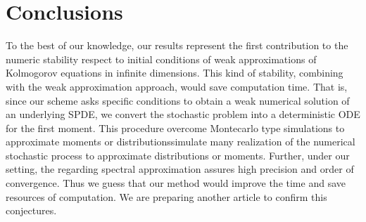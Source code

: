 \documentclass[]{interact}
\theoremstyle{plain}%
\theoremstyle{definition}
\theoremstyle{remark}
\begin{document}
\section{Conclusions}
        To the best of our knowledge, our results represent the first 
    contribution to the numeric stability respect to initial conditions of weak 
    approximations of Kolmogorov equations in infinite dimensions. This kind of 
    stability, combining with the weak approximation approach, 
    would save computation time. That is, since our scheme asks specific 
    conditions to obtain a weak numerical solution of an underlying SPDE, we 
    convert the stochastic problem into a deterministic ODE for the first 
    moment. This procedure overcome Montecarlo type simulations to  approximate 
    moments or distributions\textemdash simulate many realization of the 
    numerical stochastic process to approximate distributions or moments. 
    Further, under  our setting, the regarding spectral approximation assures 
    high precision and order of convergence. Thus we guess 
    that our method would improve the time and save resources of
    computation. We are preparing another article to confirm this 
    conjectures.
%
%
\end{document}
